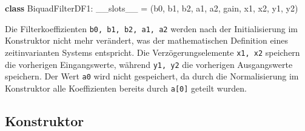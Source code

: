 \documentclass[
  ngerman,
  letterpaper,
  DIV=11]{scrreprt}
\newenvironment{Shaded}{\begin{snugshade}}{\end{snugshade}}
\newcommand{\KeywordTok}[1]{\textcolor[rgb]{0.00,0.23,0.31}{\textbf{#1}}}
\newcommand{\NormalTok}[1]{\textcolor[rgb]{0.00,0.23,0.31}{#1}}
\newcommand{\OperatorTok}[1]{\textcolor[rgb]{0.37,0.37,0.37}{#1}}
\newcommand{\StringTok}[1]{\textcolor[rgb]{0.13,0.47,0.30}{#1}}
\newcommand{\VariableTok}[1]{\textcolor[rgb]{0.07,0.07,0.07}{#1}}
\begin{document}
\begin{Shaded}
\begin{Highlighting}[]
\KeywordTok{class}\NormalTok{ BiquadFilterDF1:}
    \VariableTok{\_\_slots\_\_} \OperatorTok{=}\NormalTok{ (}\StringTok{\textquotesingle{}b0\textquotesingle{}}\NormalTok{, }\StringTok{\textquotesingle{}b1\textquotesingle{}}\NormalTok{, }\StringTok{\textquotesingle{}b2\textquotesingle{}}\NormalTok{, }\StringTok{\textquotesingle{}a1\textquotesingle{}}\NormalTok{, }\StringTok{\textquotesingle{}a2\textquotesingle{}}\NormalTok{, }\StringTok{\textquotesingle{}gain\textquotesingle{}}\NormalTok{, }\StringTok{\textquotesingle{}x1\textquotesingle{}}\NormalTok{, }\StringTok{\textquotesingle{}x2\textquotesingle{}}\NormalTok{, }\StringTok{\textquotesingle{}y1\textquotesingle{}}\NormalTok{, }\StringTok{\textquotesingle{}y2\textquotesingle{}}\NormalTok{)}
\end{Highlighting}
\end{Shaded}

Die Filterkoeffizienten \texttt{b0,\ b1,\ b2,\ a1,\ a2} werden nach der
Initialisierung im Konstruktor nicht mehr verändert, was der
mathematischen Definition eines zeitinvarianten Systems entspricht. Die
Verzögerungselemente \texttt{x1,\ x2} speichern die vorherigen
Eingangswerte, während \texttt{y1,\ y2} die vorherigen Ausgangswerte
speichern. Der Wert \texttt{a0} wird nicht gespeichert, da durch die
Normalisierung im Konstruktor alle Koeffizienten bereits durch
\texttt{a{[}0{]}} geteilt wurden.

\subsection{Konstruktor}\label{konstruktor-3}
\end{document}
